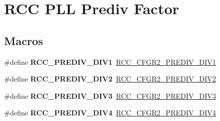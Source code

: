 \hypertarget{group___r_c_c___p_l_l___prediv___factor}{}\section{R\+CC P\+LL Prediv Factor}
\label{group___r_c_c___p_l_l___prediv___factor}
\subsection*{Macros}
\begin{DoxyCompactItemize}
\item 
\mbox{\label{group___r_c_c___p_l_l___prediv___factor_gabd3eed6433f086d9290081d821549c5a}} 
\#define {\bfseries R\+C\+C\+\_\+\+P\+R\+E\+D\+I\+V\+\_\+\+D\+I\+V1}~\hyperlink{group___peripheral___registers___bits___definition_ga9ab86296ea2711b6365499106e4c4b5a}{R\+C\+C\+\_\+\+C\+F\+G\+R2\+\_\+\+P\+R\+E\+D\+I\+V\+\_\+\+D\+I\+V1}
\item 
\mbox{\label{group___r_c_c___p_l_l___prediv___factor_ga10e8588d1e7abfe53abb7efa9a0bb2a5}} 
\#define {\bfseries R\+C\+C\+\_\+\+P\+R\+E\+D\+I\+V\+\_\+\+D\+I\+V2}~\hyperlink{group___peripheral___registers___bits___definition_ga8beaa356ccf238b4f9d8ef61dbeae7b1}{R\+C\+C\+\_\+\+C\+F\+G\+R2\+\_\+\+P\+R\+E\+D\+I\+V\+\_\+\+D\+I\+V2}
\item 
\mbox{\label{group___r_c_c___p_l_l___prediv___factor_ga3b173c7b229c3f93912c19ff82f76b76}} 
\#define {\bfseries R\+C\+C\+\_\+\+P\+R\+E\+D\+I\+V\+\_\+\+D\+I\+V3}~\hyperlink{group___peripheral___registers___bits___definition_ga554c3890138f4fabc86af31ec7508f26}{R\+C\+C\+\_\+\+C\+F\+G\+R2\+\_\+\+P\+R\+E\+D\+I\+V\+\_\+\+D\+I\+V3}
\item 
\mbox{\label{group___r_c_c___p_l_l___prediv___factor_ga67ff653fdb6a94461164ed5764c28dfe}} 
\#define {\bfseries R\+C\+C\+\_\+\+P\+R\+E\+D\+I\+V\+\_\+\+D\+I\+V4}~\hyperlink{group___peripheral___registers___bits___definition_ga03989668fed9fe564f60fb13cfcae681}{R\+C\+C\+\_\+\+C\+F\+G\+R2\+\_\+\+P\+R\+E\+D\+I\+V\+\_\+\+D\+I\+V4}
\item 
\mbox{\label{group___r_c_c___p_l_l___prediv___factor_gad4dba9a159d1871ddf6de009fbb95ea4}} 

\end{DoxyCompactItemize}
